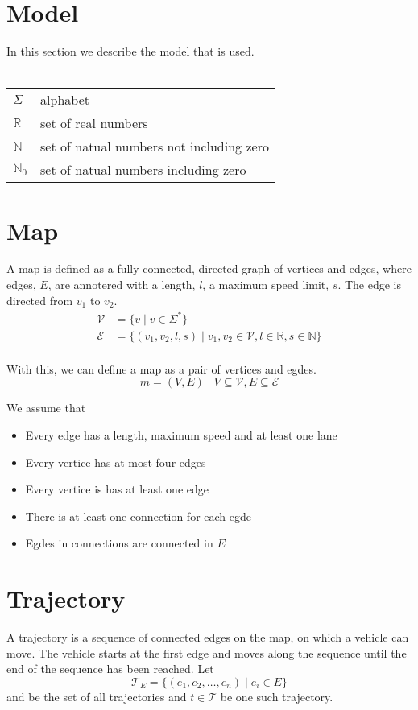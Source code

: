 \section{Model}
In this section we describe the model that is used.
\\\\
\noindent\begin{tabular}{ll}
$\Sigma$ & alphabet\\
$\mathbb{R}$ & set of real numbers\\
$\mathbb{N}$ & set of natual numbers not including zero\\
$\mathbb{N}_0$ & set of natual numbers including zero
\end{tabular}

\section{Map}
A map is defined as a fully connected, directed graph of vertices and edges, where edges, $E$, are annotered with a length, $l$, a maximum speed limit, $s$. The edge is directed from $v_1$ to $v_2$.
\begin{align}
\mathcal{V} &= \{v \mid v \in \Sigma^*\}\\
\mathcal{E} &= \{(v_1, v_2, l, s) \mid v_1, v_2 \in \mathcal{V}, l\in \mathbb{R}, s\in\mathbb{N}\}\\
\end{align}

With this, we can define a map as a pair of vertices and egdes.
\[
m = (V, E) \mid V\subseteq \mathcal{V}, E\subseteq \mathcal{E}
\]

We assume that
\begin{itemize}
\item Every edge has a length, maximum speed and at least one lane
\item Every vertice has at most four edges
\item Every vertice is has at least one edge
\item There is at least one connection for each egde
\item Egdes in connections are connected in $E$
\end{itemize}

\section{Trajectory}
A trajectory is a sequence of connected edges on the map, on which a vehicle can move. The vehicle starts at the first edge and moves along the sequence until the end of the sequence has been reached.
Let 
\[
\mathcal{T}_E = \{(e_1, e_2, \dots, e_n)\mid e_i \in E\}
\]
and be the set of all trajectories and $t\in \mathcal{T}$ be one such trajectory.

